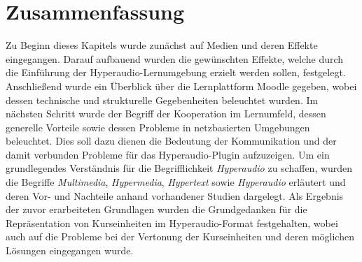 \section{Zusammenfassung}
Zu Beginn dieses Kapitels wurde zunächst auf Medien und deren Effekte eingegangen. Darauf aufbauend wurden die gewünschten Effekte, welche durch die Einführung der Hyperaudio-Lernumgebung erzielt werden sollen, festgelegt. Anschließend wurde ein Überblick über die Lernplattform Moodle gegeben, wobei dessen technische und strukturelle Gegebenheiten beleuchtet wurden. Im nächsten Schritt wurde der Begriff der Kooperation im Lernumfeld, dessen generelle Vorteile sowie dessen Probleme in netzbasierten Umgebungen beleuchtet.  Dies soll dazu dienen die Bedeutung der Kommunikation und der damit verbunden Probleme für das Hyperaudio-Plugin aufzuzeigen. Um ein grundlegendes Verständnis für die Begrifflichkeit \textit{Hyperaudio} zu schaffen, wurden die Begriffe \textit{Multimedia}, \textit{Hypermedia}, \textit{Hypertext} sowie \textit{Hyperaudio} erläutert und deren Vor- und Nachteile anhand vorhandener Studien dargelegt. Als Ergebnis der zuvor erarbeiteten Grundlagen wurden die Grundgedanken für die Repräsentation von Kurseinheiten im Hyperaudio-Format festgehalten, wobei auch auf die Probleme bei der Vertonung der Kurseinheiten und deren möglichen Lösungen eingegangen wurde.